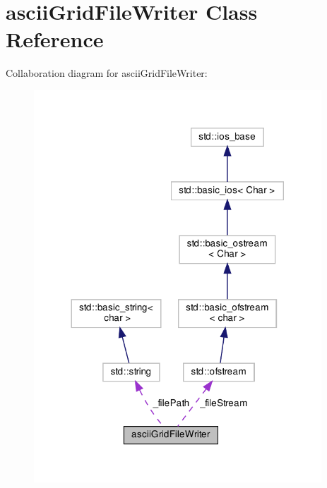 \hypertarget{classasciiGridFileWriter}{}\section{ascii\+Grid\+File\+Writer Class Reference}
\label{classasciiGridFileWriter}


Collaboration diagram for ascii\+Grid\+File\+Writer\+:
\nopagebreak
\begin{figure}[H]
\begin{center}
\leavevmode
\includegraphics[width=305pt]{classasciiGridFileWriter__coll__graph}
\end{center}
\end{figure}
